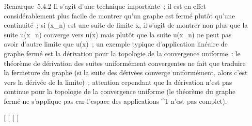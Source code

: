 \documentclass[]{article}
\begin{document}
Remarque~5.4.2 Il s'agit d'une technique importante~; il est en effet
considérablement plus facile de montrer qu'un graphe est fermé plutôt
qu'une continuité~; si (x_n) est une suite de limite x, il
s'agit de montrer non plus que la suite u(x_n) converge vers
u(x) mais plutôt que la suite u(x_n) ne peut pas avoir d'autre
limite que u(x)~; un exemple typique d'application linéaire de graphe
fermé est la dérivation pour la topologie de la convergence uniforme~:
le théorème de dérivation des suites uniformément convergentes ne fait
que traduire la fermeture du graphe (si la suite des dérivées converge
uniformément, alors c'est vers la dérivée de la limite)~; attention
cependant que la dérivation n'est pas continue pour la topologie de la
convergence uniforme (le théorème du graphe fermé ne s'applique pas car
l'espace des applications ^1 n'est pas complet).

{[}
{[}
{[}
{[}
\end{document}
